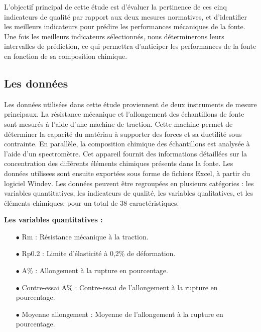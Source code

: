 \documentclass[12pt]{article}
\begin{document}
L'objectif principal de cette étude est d'évaluer la pertinence de ces 
cinq indicateurs de qualité par rapport aux deux mesures normatives, et 
d'identifier les meilleurs indicateurs pour prédire les performances 
mécaniques de la fonte. Une fois les meilleurs indicateurs sélectionnés, 
nous déterminerons leurs intervalles de prédiction, ce qui permettra 
d'anticiper les performances de la fonte en fonction de sa composition 
chimique.









\subsection{Les données}

Les données utilisées dans cette étude proviennent de deux instruments 
de mesure principaux. La résistance mécanique et l'allongement des 
échantillons de fonte sont mesurés à l'aide d'une machine de traction. 
Cette machine permet de déterminer la capacité du matériau à supporter 
des forces et sa ductilité sous contrainte. En parallèle, la composition chimique des échantillons est analysée à 
l'aide d'un spectromètre. Cet appareil fournit des informations détaillées 
sur la concentration des différents éléments chimiques présents dans la 
fonte. Les données utilisees sont ensuite exportées sous forme de fichiers 
Excel, à partir du logiciel Windev. Les données peuvent être regroupées 
en plusieurs catégories : les variables quantitatives, les indicateurs 
de qualité, les variables qualitatives, et les éléments chimiques, pour 
un total de 38 caractéristiques.

\vspace{0.5cm}

\textbf{Les variables quantitatives :}

\begin{itemize}
\item[$\bullet$] Rm : Résistance mécanique à la traction.
\item[$\bullet$] Rp0.2 : Limite d'élasticité à 0,2\% de déformation.
\item[$\bullet$] A\% : Allongement à la rupture en pourcentage.
\item[$\bullet$] Contre-essai A\% : Contre-essai de l'allongement à la rupture en pourcentage.
\item[$\bullet$] Moyenne allongement : Moyenne de l'allongement à la rupture en pourcentage.
\end{itemize}
    
\end{document}
